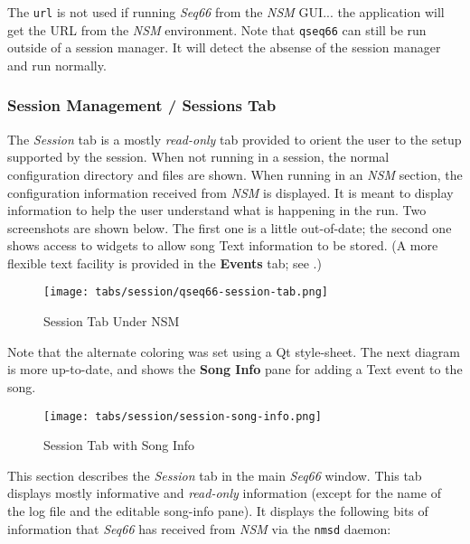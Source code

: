    The \texttt{url} is not used if running \textsl{Seq66} from the \textsl{NSM}
   GUI... the application will get the URL from the \textsl{NSM} environment.
   Note that \texttt{qseq66} can still be run outside of a
   session manager.  It will detect the absense of the session manager and run
   normally.

\subsubsection{Session Management / Sessions Tab}
\label{subsubsec:sessions_tab}

   The \textsl{Session} tab is a mostly \textsl{read-only} tab
   provided to orient the user to the setup supported by the session.
   When not running in a session, the normal configuration directory and files
   are shown.  When running in an \textsl{NSM} section, the configuration
   information received from \textsl{NSM} is displayed.
   It is meant to display information to
   help the user understand what is happening in the run.
   Two screenshots are shown below.
   The first one is a little out-of-date;
   the second one shows access to widgets to allow
   song Text information to be stored.
   (A more flexible text facility is provided in the \textbf{Events}
   tab; see .)

\begin{figure}[H]
   \centering 
   \texttt{[image: tabs/session/qseq66-session-tab.png]}
   \caption*{Session Tab Under NSM}
\end{figure}

   Note that the alternate coloring was set using a Qt style-sheet.
   The next diagram is more up-to-date, and shows the \textbf{Song Info}
   pane for adding a Text event to the song.

\begin{figure}[H]
   \centering 
   \texttt{[image: tabs/session/session-song-info.png]}
   \caption*{Session Tab with Song Info}
\end{figure}

   This section describes the \textsl{Session} tab in the main
   \textsl{Seq66} window.  This tab displays mostly informative and
   \textsl{read-only} information (except for the name of the log file
   and the editable song-info pane).
   It displays the following bits of information that \textsl{Seq66} has
   received from \textsl{NSM} via the \texttt{nmsd} daemon:

